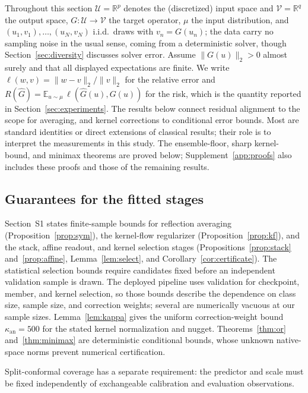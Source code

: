 Throughout this section $\mathcal U=\mathbb R^p$ denotes the (discretized) input
space and $\mathcal V=\mathbb R^q$ the output space, $G:\mathcal U\to\mathcal V$
the target operator, $\mu$ the input distribution, and
$(u_1,v_1),\dots,(u_N,v_N)$ i.i.d.\ draws with $v_n=G(u_n)$; the data carry no
sampling noise in the usual sense, coming from a deterministic solver, though
Section~\ref{sec:diversity} discusses solver error. Assume $\|G(u)\|_2>0$ almost surely and that all displayed expectations are finite. We write
$\ell(w,v)=\|w-v\|_2/\|v\|_2$ for the relative error and
$R(\widehat G)=\mathbb E_{u\sim\mu}\,\ell(\widehat G(u),G(u))$ for the risk, which is
the quantity reported in Section~\ref{sec:experiments}. The results below connect
residual alignment to the scope for averaging, and kernel corrections to
conditional error bounds. Most are standard identities or direct extensions
of classical results; their role is to interpret the measurements in this
study. The ensemble-floor, sharp kernel-bound, and minimax theorems are
proved below; Supplement~\ref{app:proofs} also includes these proofs and
those of the remaining results.

\subsection{Guarantees for the fitted stages}
\label{sec:theory-stages-summary}

Section~S1 states finite-sample bounds for reflection averaging
(Proposition~\ref{prop:sym}), the kernel-flow regularizer
(Proposition~\ref{prop:kf}), and the stack, affine readout, and kernel
selection stages (Propositions~\ref{prop:stack} and~\ref{prop:affine},
Lemma~\ref{lem:select}, and Corollary~\ref{cor:certificate}). The statistical
selection bounds require candidates fixed before an independent validation
sample is drawn. The deployed pipeline uses validation for checkpoint, member, and kernel
selection, so those bounds describe the dependence on class size, sample size, and correction
weights; several are numerically vacuous at our sample sizes.
Lemma~\ref{lem:kappa} gives the uniform correction-weight bound
$\kappa_{\mathrm{an}}=500$ for the stated kernel normalization and nugget.
Theorems~\ref{thm:or} and~\ref{thm:minimax} are deterministic conditional
bounds, whose unknown native-space norms prevent numerical certification.

Split-conformal coverage has a separate requirement: the predictor and
scale must be fixed independently of exchangeable calibration and
evaluation observations.

